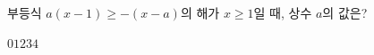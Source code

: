 부등식 $a(x-1)\ge -(x-a)$의 해가 $x\ge 1$일 때, 상수 $a$의 값은?
\begin{choices32}{$0$}{$1$}{$2$}{$3$}{$4$}\end{choices32}
